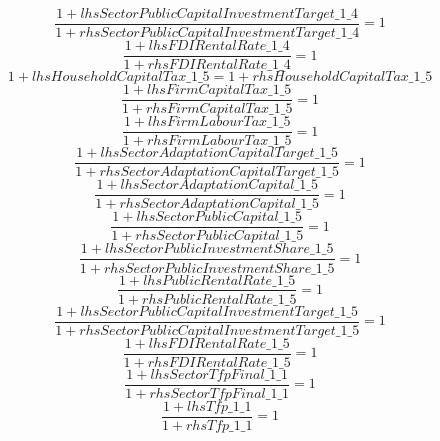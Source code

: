 \begin{dmath}
\frac{1+{lhsSectorPublicCapitalInvestmentTarget\_1\_4}}{1+{rhsSectorPublicCapitalInvestmentTarget\_1\_4}}=1
\end{dmath}
\begin{dmath}
\frac{1+{lhsFDIRentalRate\_1\_4}}{1+{rhsFDIRentalRate\_1\_4}}=1
\end{dmath}
\begin{dmath}
1+{lhsHouseholdCapitalTax\_1\_5}=1+{rhsHouseholdCapitalTax\_1\_5}
\end{dmath}
\begin{dmath}
\frac{1+{lhsFirmCapitalTax\_1\_5}}{1+{rhsFirmCapitalTax\_1\_5}}=1
\end{dmath}
\begin{dmath}
\frac{1+{lhsFirmLabourTax\_1\_5}}{1+{rhsFirmLabourTax\_1\_5}}=1
\end{dmath}
\begin{dmath}
\frac{1+{lhsSectorAdaptationCapitalTarget\_1\_5}}{1+{rhsSectorAdaptationCapitalTarget\_1\_5}}=1
\end{dmath}
\begin{dmath}
\frac{1+{lhsSectorAdaptationCapital\_1\_5}}{1+{rhsSectorAdaptationCapital\_1\_5}}=1
\end{dmath}
\begin{dmath}
\frac{1+{lhsSectorPublicCapital\_1\_5}}{1+{rhsSectorPublicCapital\_1\_5}}=1
\end{dmath}
\begin{dmath}
\frac{1+{lhsSectorPublicInvestmentShare\_1\_5}}{1+{rhsSectorPublicInvestmentShare\_1\_5}}=1
\end{dmath}
\begin{dmath}
\frac{1+{lhsPublicRentalRate\_1\_5}}{1+{rhsPublicRentalRate\_1\_5}}=1
\end{dmath}
\begin{dmath}
\frac{1+{lhsSectorPublicCapitalInvestmentTarget\_1\_5}}{1+{rhsSectorPublicCapitalInvestmentTarget\_1\_5}}=1
\end{dmath}
\begin{dmath}
\frac{1+{lhsFDIRentalRate\_1\_5}}{1+{rhsFDIRentalRate\_1\_5}}=1
\end{dmath}
\begin{dmath}
\frac{1+{lhsSectorTfpFinal\_1\_1}}{1+{rhsSectorTfpFinal\_1\_1}}=1
\end{dmath}
\begin{dmath}
\frac{1+{lhsTfp\_1\_1}}{1+{rhsTfp\_1\_1}}=1
\end{dmath}
